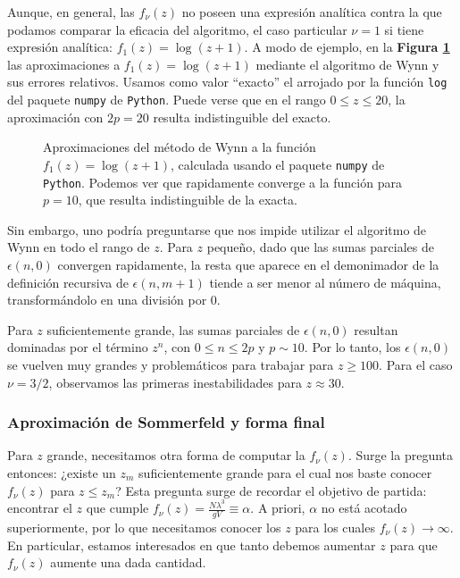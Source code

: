 Aunque, en general, las $f_\nu(z)$ no poseen una expresión analítica contra la que podamos comparar la eficacia del algoritmo, el caso particular $\nu=1$ si tiene
expresión analítica: $f_1(z) = \log(z+1)$.
A modo de ejemplo, en la \textbf{Figura \ref{fig:ej_wynn_log}} las aproximaciones a $f_1(z) = \log(z+1)$ mediante el algoritmo de Wynn y sus errores relativos.
Usamos como valor ``exacto'' el arrojado por la función \texttt{log} del paquete \texttt{numpy} de \texttt{Python}.
Puede verse que en el rango $0\leq z\leq 20$, la aproximación con $2p=20$ resulta indistinguible del exacto.

\begin{figure}[H]
	\centering
	\hspace{0.05\columnwidth}
	\caption{Aproximaciones del método de Wynn a la función $f_1(z) = \log(z+1)$, calculada usando el paquete \texttt{numpy} de \texttt{Python}.
	Podemos ver que rapidamente converge a la función para $p=10$, que resulta indistinguible de la exacta.}
	\label{fig:ej_wynn_log}
\end{figure}

Sin embargo, uno podría preguntarse que nos impide utilizar el algoritmo de Wynn en todo el rango de $z$.
Para $z$ pequeño, dado que las sumas parciales de $\epsilon(n,0)$ convergen rapidamente, la resta que aparece en el demonimador de la definición recursiva de
$\epsilon(n, m+1)$ tiende a ser menor al número de máquina, transformándolo en una división por $0$.

Para $z$ suficientemente grande, las sumas parciales de $\epsilon(n,0)$ resultan dominadas por el término $z^n$, con $0\leq n\leq 2p$ y $p\sim 10$.
Por lo tanto, los $\epsilon(n,0)$ se vuelven muy grandes y problemáticos para trabajar para $z\geq 100$.
Para el caso $\nu=3/2$, observamos las primeras inestabilidades para $z\approx 30$.


\subsubsection{Aproximación de Sommerfeld y forma final}

Para $z$ grande, necesitamos otra forma de computar la $f_\nu(z)$.
Surge la pregunta entonces: ¿existe un $z_m$ suficientemente grande para el cual nos baste conocer $f_\nu(z)$ para $z\leq z_m$?
Esta pregunta surge de recordar el objetivo de partida: encontrar el $z$ que cumple $f_\nu(z)=\frac{N\lambda^3}{gV}\equiv \alpha$.
A priori, $\alpha$ no está acotado superiormente, por lo que necesitamos conocer los $z$ para los cuales $f_\nu(z)\to\infty$.
En particular, estamos interesados en que tanto debemos aumentar $z$ para que $f_\nu(z)$ aumente una dada cantidad.

